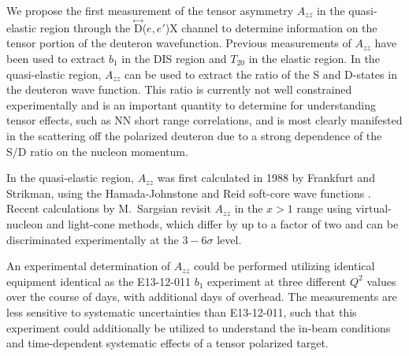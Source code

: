 

We propose the first measurement of the tensor asymmetry $A_{zz}$ in the quasi-elastic region through the $\stackrel{\leftrightarrow}{\mathrm{D}}$($e,e'$)X channel to determine information on the tensor portion of the deuteron wavefunction. Previous measurements of $A_{zz}$ have been used to extract $b_1$ in the DIS region and $T_{20}$ in the elastic region. In the quasi-elastic region,  $A_{zz}$ can be used to extract the ratio of the S and D-states in the deuteron wave function. This ratio is currently not well constrained experimentally and is an important quantity to determine for understanding tensor effects, such as NN short range correlations, and is most clearly manifested in the scattering off the polarized deuteron due to a strong dependence of the S/D ratio on the nucleon momentum.

In the quasi-elastic region, $A_{zz}$ was first calculated in 1988 by Frankfurt and Strikman, using the Hamada-Johnstone and Reid soft-core wave functions \cite{Frankfurt:1988nt}. Recent calculations by {M.~Sargsian} revisit $A_{zz}$ in the $x>1$ range using virtual-nucleon and light-cone methods, which differ by up to a factor of two \cite{MISAK} and can be discriminated experimentally at the $3-6 \sigma$ level.

An experimental determination of $A_{zz}$ could be performed utilizing identical equipment identical as the E13-12-011 $b_1$ experiment at three different $Q^2$ values over the course of \productiondays days, with \overheaddays additional days of overhead. The measurements are less sensitive to systematic uncertainties than E13-12-011, such that this experiment could additionally be utilized to understand the in-beam conditions and time-dependent systematic effects of a tensor polarized target.